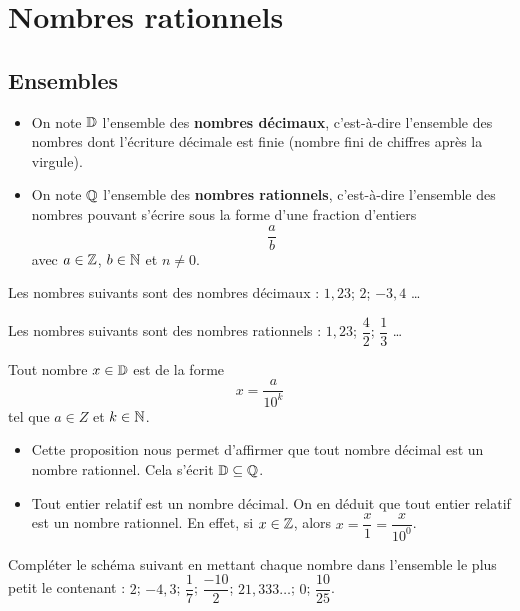 \documentclass{poly}
\begin{document}
\newpage
\section{Nombres rationnels}
\subsection{Ensembles}
\begin{definition}
\hfill
\begin{itemize}
\item On note $\mathbb{D}$ l'ensemble des \textbf{nombres décimaux}, c'est-à-dire l'ensemble des nombres dont l'écriture décimale est finie (nombre fini de chiffres après la virgule).
\item On note $\mathbb{Q}$ l'ensemble des \textbf{nombres rationnels}, c'est-à-dire l'ensemble des nombres pouvant s'écrire sous la forme d'une fraction d'entiers
\begin{equation*}
\dfrac{a}{b}
\end{equation*}
avec $a \in \mathbb{Z}$, $b \in \mathbb{N}$ et $n \neq 0$.
\end{itemize}
\end{definition}
\begin{example}
Les nombres suivants sont des nombres décimaux : $1,23$; $2$; $-3,4$ \dots

Les nombres suivants sont des nombres rationnels :
$1,23$; $\dfrac{4}{2}$; $\dfrac{1}{3}$ \dots
\end{example}
\begin{proposition}
Tout nombre $x \in \mathbb{D}$ est de la forme
\begin{equation*}
x = \dfrac{a}{10^k}
\end{equation*}
tel que $a \in Z$ et $k \in \mathbb{N}$.
\end{proposition}
\begin{remark}
\hfill
\begin{itemize}
\item Cette proposition nous permet d'affirmer que tout nombre décimal est un nombre rationnel. Cela s'écrit $\mathbb{D} \subseteq \mathbb{Q}$.
\item Tout entier relatif est un nombre décimal. On en déduit que tout entier relatif est un nombre rationnel. En effet, si $x \in \mathbb{Z}$, alors $x = \dfrac{x}{1} = \dfrac{x}{10^0}$. 
\end{itemize}
\end{remark}
\begin{example}
Compléter le schéma suivant en mettant chaque nombre dans l'ensemble le plus petit le contenant :
$2$; $-4,3$; $\dfrac{1}{7}$; $\dfrac{-10}{2}$; $21,333\dots$; $0$; $\dfrac{10}{25}$.
\begin{center}
\end{center}
\end{example}
\newpage
\end{document}

